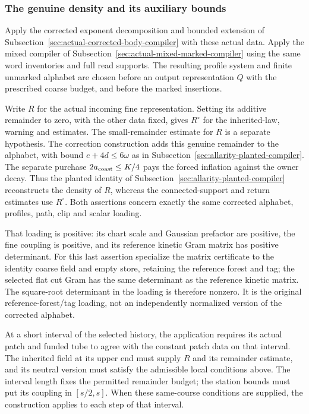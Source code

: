 \subsubsection{The genuine density and its auxiliary bounds}

Apply the corrected exponent decomposition and bounded extension of
Subsection~\ref{sec:actual-corrected-body-compiler} with these actual data.
Apply the mixed compiler of
Subsection~\ref{sec:actual-mixed-marked-compiler} using the same word
inventories and full read supports. The resulting profile system and
finite unmarked alphabet are chosen before an output representation
$Q$ with the prescribed coarse budget, and before the marked insertions.

Write $R$ for the actual incoming fine representation. Setting its
additive remainder to zero, with the other data fixed, gives
$R^\circ$ for the inherited-law, warning and estimates. The
small-remainder estimate for $R$ is a separate hypothesis. The correction construction adds this genuine
remainder to the alphabet, with bound $e+4d\le6\omega$ as in
Subsection~\ref{sec:allarity-planted-compiler}. The separate purchase
$2a_{\rm coast}\le K/4$ pays the forced inflation against the owner decay.
Thus the planted identity of Subsection~\ref{sec:allarity-planted-compiler}
reconstructs the density of $R$, whereas the connected-support and return
estimates use $R^\circ$. Both assertions concern exactly the same
corrected alphabet, profiles, path, clip and scalar loading.

That loading is positive: its chart scale and Gaussian prefactor are
positive, the fine coupling is positive, and its reference kinetic Gram
matrix has positive determinant. For this last assertion specialize the
matrix certificate to the identity coarse field and empty store, retaining
the reference forest and tag; the selected flat cut Gram has the same
determinant as the reference kinetic matrix. The square-root determinant
in the loading is therefore nonzero.
It is the original reference-forest/tag loading, not an independently
normalized version of the corrected alphabet.

At a short interval of the selected history, the application requires
its actual patch and funded tube to agree with the constant patch data
on that interval. The inherited field at its upper end must supply $R$
and its remainder estimate, and its neutral version must satisfy the
admissible local conditions above. The interval length fixes the
permitted remainder budget; the station bounds must put its coupling in
$[s/2,s]$. When these same-course conditions are supplied, the construction
applies to each step of that interval.

